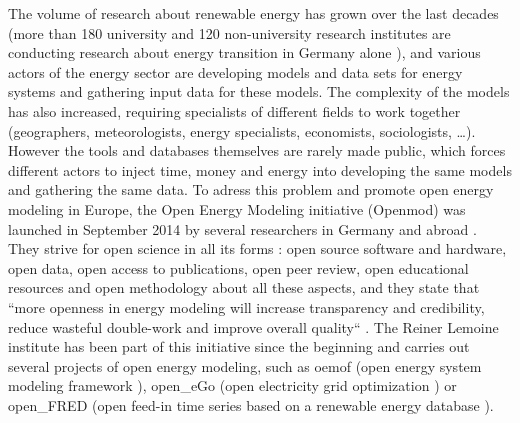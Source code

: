 The volume of research about renewable energy has grown over the last decades (more than 180 university and 120 non-university research institutes are conducting research about energy transition in Germany alone \cite{bmbf_energiewende}), and various actors of the energy sector are developing models and data sets for energy systems and gathering input data for these models. The complexity of the models has also increased, requiring specialists of different fields to work together (geographers, meteorologists, energy specialists, economists, sociologists, …). However the tools and databases themselves are rarely made public, which forces different actors to inject time, money and energy into developing the same models and gathering the same data. \newline
To adress this problem and promote open energy modeling in Europe, the Open Energy Modeling initiative (Openmod) was launched in September 2014 by several researchers in Germany and abroad \cite{openmod_workshop}. They strive for open science in all its forms : open source software and hardware, open data, open access to publications, open peer review, open educational resources and open methodology about all these aspects, and they state that ``more openness in energy modeling will increase transparency and credibility, reduce wasteful double-work and improve overall quality`` \cite{openmod_manifesto}. \newline
The Reiner Lemoine institute has been part of this initiative since the beginning and  carries out several projects of open energy modeling, such as oemof (open energy system modeling framework \cite{rli_oemof}), open\_eGo (open electricity grid optimization \cite{rli_openego}) or open\_FRED (open feed-in time series based on a renewable energy database \cite{rli_openfred}). 

